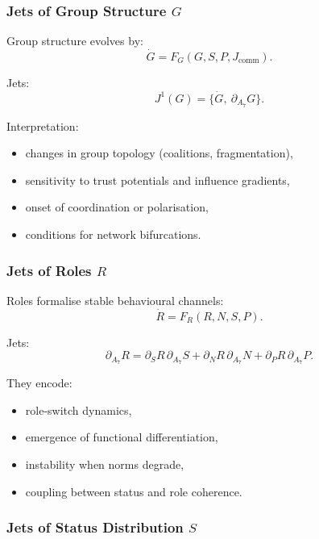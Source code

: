 \subsubsection{Jets of Group Structure \texorpdfstring{$G$}{G}}

Group structure evolves by:
\[
\dot{G} = F_G(G,S,P,J_{\mathrm{comm}}).
\]

Jets:
\[
J^1(G) = \{\dot{G},\ \partial_{A_7}G\}.
\]

Interpretation:
\begin{itemize}
    \item changes in group topology (coalitions, fragmentation),
    \item sensitivity to trust potentials and influence gradients,
    \item onset of coordination or polarisation,
    \item conditions for network bifurcations.
\end{itemize}


\subsubsection{Jets of Roles \texorpdfstring{$R$}{R}}

Roles formalise stable behavioural channels:
\[
\dot{R}=F_R(R,N,S,P).
\]

Jets:
\[
\partial_{A_7}R
=
\partial_{S}R\,\partial_{A_7}S
+\partial_{N}R\,\partial_{A_7}N
+\partial_{P}R\,\partial_{A_7}P.
\]

They encode:
\begin{itemize}
    \item role-switch dynamics,
    \item emergence of functional differentiation,
    \item instability when norms degrade,
    \item coupling between status and role coherence.
\end{itemize}


\subsubsection{Jets of Status Distribution \texorpdfstring{$S$}{S}}

